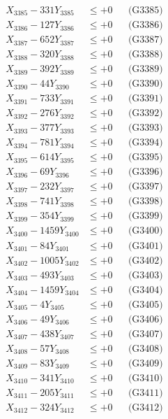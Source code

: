 \documentclass[a4paper,10pt]{article}
\begin{document}
{\begin{align}
X_{3385} - 331Y_{3385} &\leq +0 && \text{(G3385)} \\
X_{3386} - 127Y_{3386} &\leq +0 && \text{(G3386)} \\
X_{3387} - 652Y_{3387} &\leq +0 && \text{(G3387)} \\
X_{3388} - 320Y_{3388} &\leq +0 && \text{(G3388)} \\
X_{3389} - 392Y_{3389} &\leq +0 && \text{(G3389)} \\
X_{3390} - 44Y_{3390} &\leq +0 && \text{(G3390)} \\
\allowbreak
X_{3391} - 733Y_{3391} &\leq +0 && \text{(G3391)} \\
X_{3392} - 276Y_{3392} &\leq +0 && \text{(G3392)} \\
X_{3393} - 377Y_{3393} &\leq +0 && \text{(G3393)} \\
X_{3394} - 781Y_{3394} &\leq +0 && \text{(G3394)} \\
X_{3395} - 614Y_{3395} &\leq +0 && \text{(G3395)} \\
X_{3396} - 69Y_{3396} &\leq +0 && \text{(G3396)} \\
X_{3397} - 232Y_{3397} &\leq +0 && \text{(G3397)} \\
X_{3398} - 741Y_{3398} &\leq +0 && \text{(G3398)} \\
X_{3399} - 354Y_{3399} &\leq +0 && \text{(G3399)} \\
X_{3400} - 1459Y_{3400} &\leq +0 && \text{(G3400)} \\
\allowbreak
X_{3401} - 84Y_{3401} &\leq +0 && \text{(G3401)} \\
X_{3402} - 1005Y_{3402} &\leq +0 && \text{(G3402)} \\
X_{3403} - 493Y_{3403} &\leq +0 && \text{(G3403)} \\
X_{3404} - 1459Y_{3404} &\leq +0 && \text{(G3404)} \\
X_{3405} - 4Y_{3405} &\leq +0 && \text{(G3405)} \\
X_{3406} - 49Y_{3406} &\leq +0 && \text{(G3406)} \\
X_{3407} - 438Y_{3407} &\leq +0 && \text{(G3407)} \\
X_{3408} - 57Y_{3408} &\leq +0 && \text{(G3408)} \\
X_{3409} - 83Y_{3409} &\leq +0 && \text{(G3409)} \\
X_{3410} - 341Y_{3410} &\leq +0 && \text{(G3410)} \\
\allowbreak
X_{3411} - 205Y_{3411} &\leq +0 && \text{(G3411)} \\
X_{3412} - 324Y_{3412} &\leq +0 && \text{(G3412)} \\

\end{align}}
\end{document}

